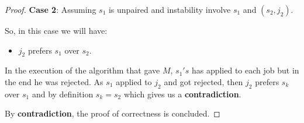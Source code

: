 \documentclass{article}
\let\bold\textbf
\newenvironment{myenv}{\begin{adjustwidth}{1cm}{}}{\end{adjustwidth}}
\begin{document}
{{\begin{proof}
      \bold{Case 2}: Assuming $s_1$ is unpaired and instability involve $s_1$ and $(s_2,j_2)$.
      \begin{myenv}
        So, in this case we will have:
        \begin{itemize}
          \item $j_2$ prefers $s_1$ over $s_2$.
        \end{itemize}
        In the execution of the algorithm that gave $M$, $s_1's$ has applied to each job but in the end he was rejected. \newline
        As $s_1$ applied to $j_2$ and got rejected, then $j_2$ prefers $s_k$ over $s_1$ and by definition $s_k=s_2$ which gives us a \bold{contradiction}.
      \end{myenv}
      By \bold{contradiction}, the proof of correctness is concluded.
    \end{proof}
  }
}
\newpage
\end{document}

